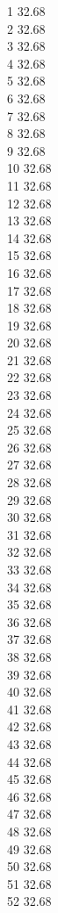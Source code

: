 1	32.68\\
2	32.68\\
3	32.68\\
4	32.68\\
5	32.68\\
6	32.68\\
7	32.68\\
8	32.68\\
9	32.68\\
10	32.68\\
11	32.68\\
12	32.68\\
13	32.68\\
14	32.68\\
15	32.68\\
16	32.68\\
17	32.68\\
18	32.68\\
19	32.68\\
20	32.68\\
21	32.68\\
22	32.68\\
23	32.68\\
24	32.68\\
25	32.68\\
26	32.68\\
27	32.68\\
28	32.68\\
29	32.68\\
30	32.68\\
31	32.68\\
32	32.68\\
33	32.68\\
34	32.68\\
35	32.68\\
36	32.68\\
37	32.68\\
38	32.68\\
39	32.68\\
40	32.68\\
41	32.68\\
42	32.68\\
43	32.68\\
44	32.68\\
45	32.68\\
46	32.68\\
47	32.68\\
48	32.68\\
49	32.68\\
50	32.68\\
51	32.68\\
52	32.68\\
